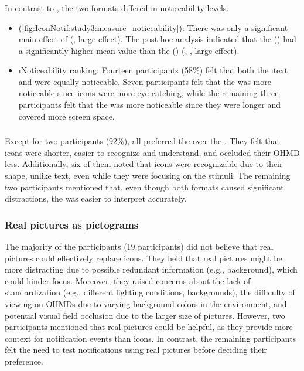 \subsubsection*{\Reaction{}}
\label{sec:IconNotif:study3:reaction_parameter}
In contrast to \studytwo{}, the two formats differed in noticeability levels.

\begin{itemize}
    \item \noticeability{} (\autoref{fig:IconNotif:study3:measure_noticeability}): There was only a significant main effect of \format{} (, large effect). The post-hoc analysis indicated that the \iconformat{} () had a significantly higher mean value than the \textformat{} () (, , large effect).
    
    \item \i{Noticeability ranking}: Fourteen participants (58\%) felt that both the \i{text} and  were equally noticeable. Seven participants felt that the \iconformat{} was more noticeable since icons were more eye-catching, while the remaining three participants felt that the \textformat{} was more noticeable since they were longer and covered more screen space.
\end{itemize}


\subsubsection*{\Satisfaction{}}
\label{sec:IconNotif:study3:satisfaction_parameter}

Except for two participants (92\%), all preferred the \iconformat{} over the \textformat{}. They felt that icons were shorter, easier to recognize and understand, and occluded their OHMD less.
Additionally, six of them noted that icons were recognizable due to their shape, unlike text, even while they were focusing on the stimuli.
The remaining two participants mentioned that, even though both formats caused significant distractions, the \textformat{} was easier to interpret accurately.


\subsubsection*{Real pictures as pictograms}

The majority of the participants (19 participants) did not believe that real pictures could effectively replace icons. They held that real pictures might be more distracting due to possible redundant information (e.g., background), which could hinder focus. Moreover, they raised concerns about the lack of standardization (e.g., different lighting conditions, backgrounds), the difficulty of viewing on OHMDs due to varying background colors in the environment, and potential visual field occlusion due to the larger size of pictures. However, two participants mentioned that real pictures could be helpful, as they provide more context for notification events than icons. In contrast, the remaining participants felt the need to test notifications using real pictures before deciding their preference.



